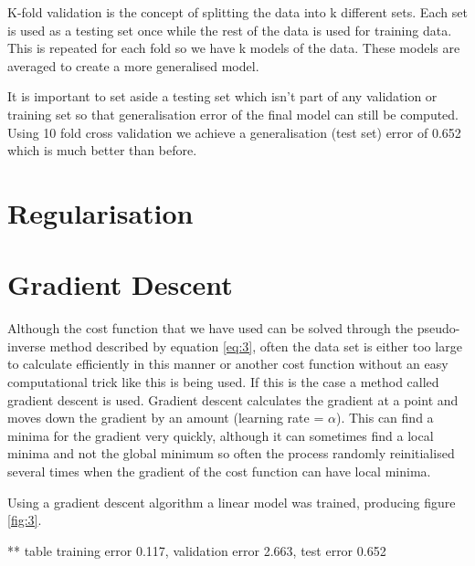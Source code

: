 \documentclass[a4paper,11pt, twocolumn]{article}
\begin{document}
K-fold validation is the concept of splitting the data into k different sets. Each set is used as a testing set once while the rest of the data is used for training data. This is repeated for each fold so we have k models of the data. These models are averaged to create a more generalised model.

It is important to set aside a testing set which isn't part of any validation or training set so that generalisation error of the final model can still be computed. Using 10 fold cross validation we achieve a generalisation (test set) error of 0.652 which is much better than before. 
\section{Regularisation}
\section{Gradient Descent}
Although the cost function that we have used can be solved through the pseudo-inverse method described by equation \ref{eq:3}, often the data set is either too large to calculate efficiently in this manner or another cost function without an easy computational trick like this is being used. If this is the case a method called gradient descent is used. Gradient descent calculates the gradient at a point and moves down the gradient by an amount (learning rate = $\alpha$). This can find a minima for the gradient very quickly, although it can sometimes find a local minima and not the global minimum so often the process randomly reinitialised several times when the gradient of the cost function can have local minima. 

Using a gradient descent algorithm a linear model was trained, producing figure \ref{fig:3}. 

** table training error 0.117, validation error 2.663, test error 0.652
\end{document}
